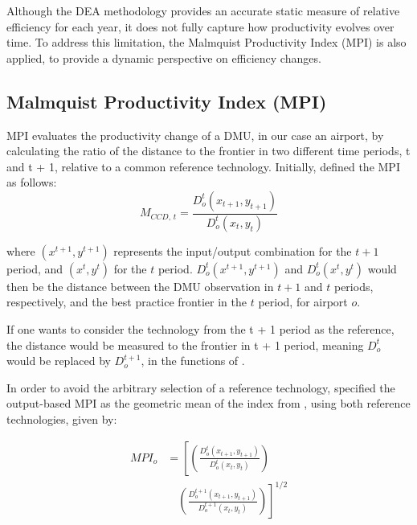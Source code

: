 \clearpage
 Although the DEA methodology provides an accurate
static measure of relative efficiency for each year, it does not fully capture how productivity evolves over
time. To address this limitation, the Malmquist Productivity Index (MPI) is also applied, to provide a
dynamic perspective on efficiency changes.

\subsection{Malmquist Productivity Index (MPI)}
\label{mpi}

MPI evaluates the productivity change of a DMU, in our case an airport, by calculating the ratio of
the distance to the frontier in two different time periods, t and t + 1, relative to a common reference
technology. Initially, \cite{caves1982} defined the MPI as follows:
\vspace{-0.01cm}
\begin{equation}   
    \label{eq:MI1} 
M_{CCD,\,t} = \frac{D^{t}_{o}\left(x_{t+1}, y_{t+1}\right)}{D^{t}_{o}\left(x_{t}, y_{t}\right)}         
\end{equation}

where $\left(x^{t+1}, y^{t+1}\right)$ represents the input/output combination for the $t+1$ period, and $\left(x^{t}, y^{t}\right)$  for the $t$ period. $D^{t}_{o}\left(x^{t+1}, y^{t+1}\right)$ and $D^{t}_{o}\left(x^{t}, y^{t}\right)$ would then be the distance between the DMU observation in $t+1$ and $t$ periods, respectively, and the best practice frontier in the $t$ period, for airport $o$. 

If one wants to consider the technology from the t + 1 period as the reference, the distance would be measured to the frontier in t + 1 period, meaning $D^{t}_{o}$ would be replaced by $D^{t+1}_{o}$, in the functions of . 

In order to avoid the arbitrary selection of a reference technology, \cite{fare1994} specified the
output-based MPI as the geometric mean of the index from , using both reference technologies, given by:




\begin{equation}
    \label{eq:MI3}
\begin{aligned}
MPI_{o} &= \left[ \left( \frac{D^{t}_{o}(x_{t+1}, y_{t+1})}{D^{t}_{o}(x_{t}, y_{t})} \right) \right. \\
&\quad \left. \left( \frac{D^{t+1}_{o}(x_{t+1}, y_{t+1})}{D^{t+1}_{o}(x_{t}, y_{t})} \right) \right]^{1/2}
\end{aligned}
\end{equation}


